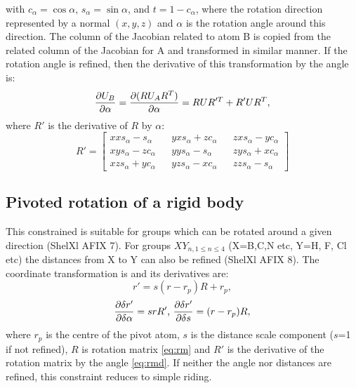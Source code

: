 \documentclass[pdf]{iucr}
\begin{document}
with $c_\alpha=\cos\alpha$, $s_\alpha=\sin\alpha$, and $t=1-c_\alpha$, where the rotation direction represented by a normal $(x,y,z)$ and $\alpha$ is the rotation angle around this direction. The column of the Jacobian related to atom B is copied from the related column of the Jacobian for A and transformed in similar manner. If the rotation angle is refined, then the derivative of this transformation by the angle is:
\begin{equation}
\frac{\partial U_{B}}{\partial \alpha} = \frac{\partial (RU_{A}R^{T})}{\partial \alpha} = RUR'^{T} + R'UR^{T},
\end{equation}
where $R'$ is the derivative of $R$ by $\alpha$:
\begin{equation}
R' = 
  \begin{bmatrix} \label{eq:rmd}
    xx s_\alpha -  s_\alpha && yx s_\alpha + z c_\alpha && zx s_\alpha - y c_\alpha \\
    xy s_\alpha - z c_\alpha && yy s_\alpha -  s_\alpha && zy s_\alpha + x c_\alpha \\
    xz s_\alpha + y c_\alpha && yz s_\alpha - x c_\alpha && zz s_\alpha - s_\alpha
  \end{bmatrix}
\end{equation}

\subsection{Pivoted rotation of a rigid body}
\label{sec:pivoted_rotated_group}
This constrained is suitable for groups which can be rotated around a given direction (ShelXl AFIX 7). For groups $XY_{n, 1\leq n \leq 4}$ (X=B,C,N etc, Y=H, F, Cl etc) the distances from X to Y can also be refined (ShelXl AFIX 8). The coordinate transformation is and its derivatives are:
\begin{equation}
r' = s(r-r_{p})R + r_{p},
\end{equation}
\begin{equation}
\frac{\partial \delta r'}{\partial \delta \alpha} = srR' \text{, } \frac{\partial \delta r'}{\partial \delta s} = (r-r_{p})R,
\end{equation}
where $r_{p}$ is the centre of the pivot atom, $s$ is the distance scale component ($s$=1 if not refined), $R$ is rotation matrix \ref{eq:rm} and $R'$ is the derivative of the rotation matrix by the angle \ref{eq:rmd}. If neither the angle nor distances are refined, this constraint reduces to simple riding.
\end{document}
